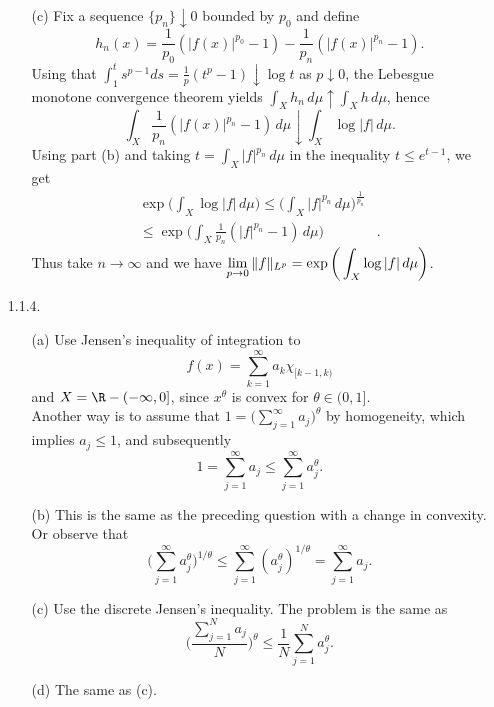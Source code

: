 \begin{enumerate}
\begin{enumerate}
    \item[(c)] Fix a sequence $\{p_n\} \downarrow 0$ bounded by $p_0$ and define
    \[h_n(x)=\frac{1}{p_0}(|f(x)|^{p_0}-1)-\frac{1}{p_n}(|f(x)|^{p_n}-1).\]
    Using that $\int_1^t s^{p-1}ds = \frac{1}{p}(t^{p}-1) \downarrow \log t$ as $p\downarrow0$, 
    the Lebesgue monotone convergence theorem yields 
    $\int_Xh_n\,d\mu\uparrow\int_Xh\,d\mu$, hence
    \[\int_{X}\frac{1}{p_n}(|f(x)|^{p_n}-1)\,d\mu \downarrow \int_{X}\log|f|\,d\mu.\]
    Using part (b) and taking $t=\int_X |f|^{p_n}\,d\mu$ 
    in the inequality $t\leq e^{t-1}$, we get
    \begin{align*}\exp\bigg(\int_{X}\log|f|\,d\mu\bigg) 
    \leq \bigg(\int_{X}|f|^{p_{n}}\,d\mu\bigg)^{\frac{1}{p_{n}}}& \\
    \leq \exp\bigg(\int_{X}\frac{1}{p_{n}}(|f|^{p_{n}}-1)\,d\mu\bigg)&. 
    \end{align*}
    Thus take $n \rightarrow \infty$ and we have 
    $\displaystyle{\lim_{p \rightarrow 0} \norm{f}_{L^p} 
    = \exp\bigg(\int_{X}\log|f|\,d\mu\bigg)}$. 
    \end{enumerate}

\item[1.1.4.]
    \begin{enumerate}
    \item[(a)] Use Jensen's inequality of integration to 
    \[f(x)=\sum_{k=1}^{\infty}a_{k}\chi_{[k-1,k)}\] and $X=\R-(-\infty,0]$, 
    since $x^{\theta}$ is convex for $\theta \in (0,1]$.\\
    Another way is to assume that $1=\big(\sum_{j=1}^\infty a_j\big)^\theta$ by homogeneity, 
    which implies $a_j\leq1$, and subsequently 
    \[1=\sum_{j=1}^\infty a_j\leq\sum_{j=1}^\infty a_j^\theta.\]
    
    \item[(b)] This is the same as the preceding question 
    with a change in convexity. Or observe that
    \[\bigg(\sum_{j=1}^\infty a_j^\theta\bigg)^{1/\theta}
    \leq\sum_{j=1}^\infty (a_j^\theta)^{1/\theta}=\sum_{j=1}^\infty a_j.\]
    
    \item[(c)] Use the discrete Jensen's inequality. The problem is the same as 
    \[\bigg(\frac{\sum_{j=1}^{N}a_{j}}{N}\bigg)^{\theta} 
    \leq \frac{1}{N}\sum_{j=1}^{N}a_{j}^{\theta}.\]
    
    \item[(d)] The same as (c).
    \end{enumerate}


\end{enumerate}
